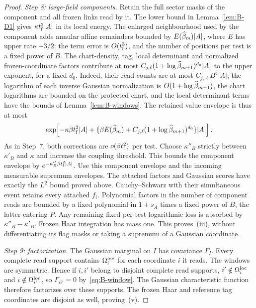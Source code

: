 \begin{proof}
\emph{Step 8: large-field components.} Retain the full sector masks of the component and all frozen links read by it. The lower bound in Lemma~\ref{lem:B-D1} gives $\kappa t_{\rm f}^2|A|$ in its local energy. The enlarged neighbourhood used by the component adds annular affine remainders bounded by $E(\widehat{\beta}_m)|A|$, where $E$ has upper rate $-3/2$: the term error is $O(t_{\rm f}^3)$, and the number of positions per test is a fixed power of $B$. The chart-density, tag, local determinant and normalized frozen-coordinate factors contribute at most $C_{j,\ell}(1+\log\widehat{\beta}_{m+1})^{d_0}|A|$ to the upper exponent, for a fixed $d_0$. Indeed, their read counts are at most $C_{j,\ell}B^4|A|$; the logarithm of each inverse Gaussian normalization is $O(1+\log\widehat{\beta}_{m+1})$, the chart logarithms are bounded on the protected chart, and the local determinant terms have the bounds of Lemma~\ref{lem:B-windows}. The retained value envelope is thus at most
\begin{equation*}
\exp\!\left[-\kappa\beta t_{\rm f}^2|A|+
 \{\beta E(\widehat{\beta}_m)+C_{j,\ell}(1+\log\widehat{\beta}_{m+1})^{d_0}\}|A|\right].
\end{equation*}
As in Step~7, both corrections are $o(\beta t_{\rm f}^2)$ per test. Choose $\kappa''_B$ strictly between $\kappa'_B$ and $\kappa$ and increase the coupling threshold. This bounds the component envelope by $e^{-\kappa''_B\beta t_{\rm f}^2|A|}$. Use this component envelope and the incoming measurable supremum envelopes. The attached factors and Gaussian scores have exactly the $L^2$ bound proved above. Cauchy--Schwarz with their simultaneous event retains every attached $f_i$. Polynomial factors in the number of component reads are bounded by a fixed polynomial in $1+s_A$ times a fixed power of $B$, the latter entering $P$. Any remaining fixed per-test logarithmic loss is absorbed by $\kappa''_B-\kappa'_B$. Frozen Haar integration has mass one. This proves~(iii), without differentiating its flag masks or taking a supremum of a Gaussian coordinate.

\emph{Step 9: factorization.} The Gaussian marginal on $I$ has covariance $\Gamma_I$. Every complete read support contains $\Omega_i^{\rm loc}$ for each coordinate $i$ it reads. The windows are symmetric. Hence if $i,i'$ belong to disjoint complete read supports, $i'\notin\Omega_i^{\rm loc}$ and $i\notin\Omega_{i'}^{\rm loc}$, so $\Gamma_{ii'}=0$ by~\eqref{eq:B-window}. The Gaussian characteristic function therefore factorizes over these supports. The frozen Haar and reference tag coordinates are disjoint as well, proving~(v).
\end{proof}
